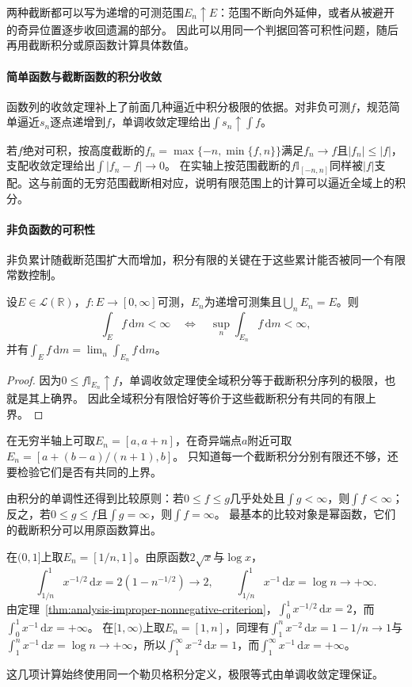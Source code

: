 两种截断都可以写为递增的可测范围$E_n\uparrow E$：范围不断向外延伸，或者从被避开的奇异位置逐步收回遗漏的部分。
因此可以用同一个判据回答可积性问题，随后再用截断积分或原函数计算具体数值。

\paragraph{简单函数与截断函数的积分收敛}
函数列的收敛定理补上了前面几种逼近中积分极限的依据。对非负可测$f$，规范简单逼近$s_n$逐点递增到$f$，单调收敛定理给出$\int s_n\uparrow\int f$。

若$f$绝对可积，按高度截断的$f_n=\max\{-n,\min\{f,n\}\}$满足$f_n\to f$且$|f_n|\leq|f|$，支配收敛定理给出$\int|f_n-f|\to0$。
在实轴上按范围截断的$f\mathbb I_{[-n,n]}$同样被$|f|$支配。这与前面的无穷范围截断相对应，说明有限范围上的计算可以逼近全域上的积分。

\paragraph{非负函数的可积性}
非负累计随截断范围扩大而增加，积分有限的关键在于这些累计能否被同一个有限常数控制。
\begin{theorem}[非负截断累计的有界判据]
\label{thm:analysis-improper-nonnegative-criterion}
设$E\in\mathcal L(\mathbb R)$，$f:E\to[0,\infty]$可测，$E_n$为递增可测集且$\bigcup_nE_n=E$。则
\[
 \int_Ef\,\mathrm dm<\infty
 \quad\Longleftrightarrow\quad
 \sup_n\int_{E_n}f\,\mathrm dm<\infty,
\]
并有$\int_Ef\,\mathrm dm=\lim_n\int_{E_n}f\,\mathrm dm$。
\end{theorem}
\begin{proof}
因为$0\leq f\mathbb I_{E_n}\uparrow f$，单调收敛定理使全域积分等于截断积分序列的极限，也就是其上确界。
因此全域积分有限恰好等价于这些截断积分有共同的有限上界。
\end{proof}
在无穷半轴上可取$E_n=[a,a+n]$，在奇异端点$a$附近可取$E_n=[a+(b-a)/(n+1),b]$。
只知道每一个截断积分分别有限还不够，还要检验它们是否有共同的上界。

由积分的单调性还得到比较原则：若$0\leq f\leq g$几乎处处且$\int g<\infty$，则$\int f<\infty$；反之，若$0\leq g\leq f$且$\int g=\infty$，则$\int f=\infty$。
最基本的比较对象是幂函数，它们的截断积分可以用原函数算出。
\begin{example}[用截断计算幂函数的反常积分]
\label{ex:analysis-power-integral-truncations}
在$(0,1]$上取$E_n=[1/n,1]$。由原函数$2\sqrt x$与$\log x$，
\[
 \int_{1/n}^1x^{-1/2}\,\mathrm dx=2(1-n^{-1/2})\longrightarrow2,
 \qquad
 \int_{1/n}^1x^{-1}\,\mathrm dx=\log n\longrightarrow+\infty.
\]
由定理~\ref{thm:analysis-improper-nonnegative-criterion}，$\int_0^1x^{-1/2}\,\mathrm dx=2$，而$\int_0^1x^{-1}\,\mathrm dx=+\infty$。
在$[1,\infty)$上取$E_n=[1,n]$，同理有$\int_1^nx^{-2}\,\mathrm dx=1-1/n\to1$与$\int_1^nx^{-1}\,\mathrm dx=\log n\to+\infty$，所以$\int_1^\infty x^{-2}\,\mathrm dx=1$，而$\int_1^\infty x^{-1}\,\mathrm dx=+\infty$。
\end{example}
这几项计算始终使用同一个勒贝格积分定义，极限等式由单调收敛定理保证。

